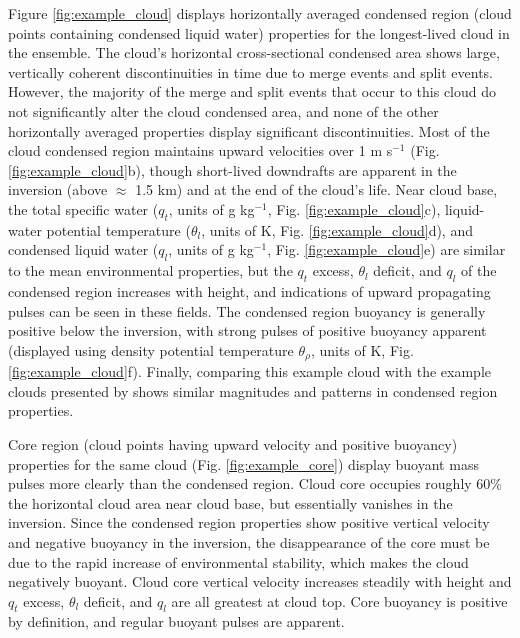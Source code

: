 \documentclass[acp]{copernicus}
\begin{document}
Figure \ref{fig:example_cloud} displays horizontally averaged condensed region 
(cloud points containing condensed liquid water) properties for the 
longest-lived cloud in the ensemble.  The cloud's horizontal cross-sectional 
condensed area shows large, vertically coherent discontinuities in time due to 
merge events and split events.  However, the majority of the merge and split 
events that occur to this cloud do not significantly alter the cloud condensed 
area, and none of the other horizontally averaged properties display 
significant discontinuities.  Most of the cloud condensed region maintains 
upward velocities over 1 m s$^{-1}$ (Fig. \ref{fig:example_cloud}b), though 
short-lived downdrafts are apparent in the inversion (above $\approx$ 1.5 km) 
and at the end of the cloud's life.  Near cloud base, the total specific water 
($q_t$, units of g kg$^{-1}$, Fig. \ref{fig:example_cloud}c), liquid-water 
potential temperature ($\theta_l$, units of K, Fig. 
\ref{fig:example_cloud}d), and condensed liquid water ($q_l$, units of 
g kg$^{-1}$, Fig. \ref{fig:example_cloud}e) are similar to the mean 
environmental properties, but the $q_t$ excess, $\theta_l$ deficit, and 
$q_l$ of the condensed region increases with height, and indications of upward 
propagating pulses can be seen in these fields.  The condensed region buoyancy 
is generally positive below the inversion, with strong pulses of positive 
buoyancy apparent (displayed using density potential temperature 
$\theta_\rho$, units of K, Fig. \ref{fig:example_cloud}f).  Finally, 
comparing this example cloud with the example clouds presented by 
\citet[][figs. 4 and 5]{Heus2009} shows similar magnitudes and patterns in 
condensed region properties.

Core region (cloud points having upward velocity and positive buoyancy) 
properties for the same cloud (Fig. \ref{fig:example_core}) display buoyant 
mass pulses more clearly than the condensed region.  Cloud core occupies 
roughly 60\% the horizontal cloud area near cloud base, but essentially 
vanishes in the inversion.  Since the condensed region properties show positive 
vertical velocity and negative buoyancy in the inversion, the disappearance of 
the core must be due to the rapid increase of environmental stability, which 
makes the cloud negatively buoyant.  Cloud core vertical velocity increases 
steadily with height and $q_t$ excess, $\theta_l$ deficit, and $q_l$ are all 
greatest at cloud top.  Core buoyancy is positive by definition, and regular 
buoyant pulses are apparent.
\end{document}
